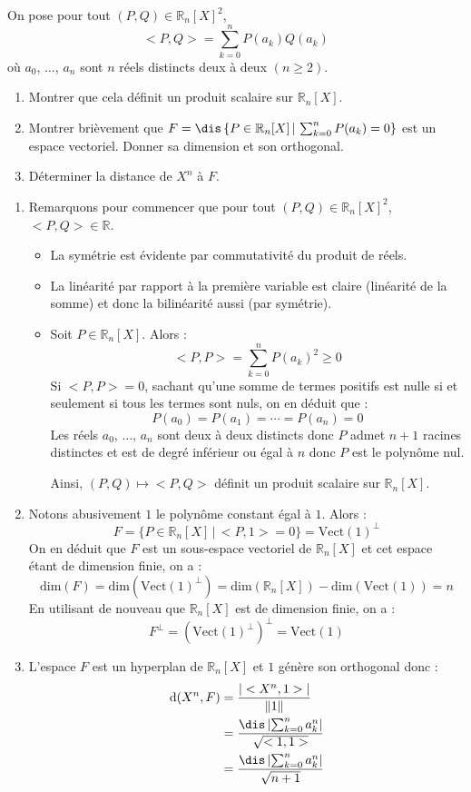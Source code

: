 \documentclass[a4paper,10pt]{report}
\begin{document}
\begin{Exercice}{} On pose pour tout $(P,Q) \in \mathbb{R}_n[X]^2$,
$$ <P,Q> = \sum_{k=0}^n P(a_k) Q(a_k)$$
où $a_0$, $\ldots$, $a_n$ sont $n$ réels distincts deux à deux $(n \geq 2)$.
\begin{enumerate}
\item Montrer que cela définit un produit scalaire sur $\mathbb{R}_n[X]$.
\item Montrer brièvement que $F= \dis \left\lbrace P \in \mathbb{R}_n[X] \, \vert \, \sum_{k=0}^n P(a_k)=0 \right\rbrace$ est un espace vectoriel. Donner sa dimension et son orthogonal.
\item Déterminer la distance de $X^n$ à $F$.
\end{enumerate}
\end{Exercice}

\corr \begin{enumerate}
\item Remarquons pour commencer que pour tout $(P,Q) \in \mathbb{R}_n[X]^2$, $<P,Q> \in \mathbb{R}$.
\begin{itemize}
\item La symétrie est évidente par commutativité du produit de réels.
\item La linéarité par rapport à la première variable est claire (linéarité de la somme) et donc la bilinéarité aussi (par symétrie).
\item Soit $P \in \mathbb{R}_n[X]$. Alors :
$$ <P,P> =  \sum_{k=0}^n P(a_k)^2 \geq 0$$
Si $<P,P>=0$, sachant qu'une somme de termes positifs est nulle si et seulement si tous les termes sont nuls, on en déduit que :
$$ P(a_0)= P(a_1) = \cdots = P(a_n)=0$$
Les réels $a_0$, $\ldots$, $a_n$ sont deux à deux distincts donc $P$ admet $n+1$ racines distinctes et est de degré inférieur ou égal à $n$ donc $P$ est le polynôme nul.

\medskip

\noindent Ainsi, $(P,Q) \mapsto <P,Q>$ définit un produit scalaire sur $\mathbb{R}_n[X]$.
\end{itemize}
\item Notons abusivement $1$ le polynôme constant égal à $1$. Alors :
$$ F = \lbrace P \in \mathbb{R}_n[X] \, \vert \, <P,1>= 0 \rbrace = \textrm{Vect}(1)^{\perp}$$
On en déduit que $F$ est un sous-espace vectoriel de $ \mathbb{R}_n[X]$ et cet espace étant de dimension finie, on a :
$$ \textrm{dim}(F) =  \textrm{dim}(\textrm{Vect}(1)^{\perp}) =  \textrm{dim}(\mathbb{R}_n[X]) -  \textrm{dim}(\textrm{Vect}(1)) = n$$
En utilisant de nouveau que $ \mathbb{R}_n[X]$ est de dimension finie, on a :
$$ F^{\perp} = (\textrm{Vect}(1)^{\perp})^{\perp} = \textrm{Vect}(1)$$
\item L'espace $F$ est un hyperplan de $\mathbb{R}_n[X]$ et $1$ génère son orthogonal donc :
\begin{align*}
\textrm{d}(X^n, F) & = \dfrac{\vert <X^n,1> \vert}{\Vert 1 \Vert} \\
& = \dfrac{\dis\left\vert \sum_{k=0}^n a_k^n \right\vert }{\sqrt{<1,1>}} \\
& = \dfrac{\dis\left\vert \sum_{k=0}^n a_k^n \right\vert }{\sqrt{n+1}} 
\end{align*}
\end{enumerate}
\end{document}
